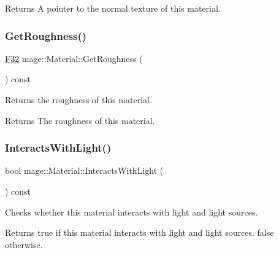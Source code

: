 \begin{DoxyReturn}{Returns}
A pointer to the normal texture of this material. 
\end{DoxyReturn}
\hypertarget{structmage_1_1_material_a5b1a4e965f812e18594cf7455d49139c}{}\label{structmage_1_1_material_a5b1a4e965f812e18594cf7455d49139c} 
\subsubsection{\texorpdfstring{Get\+Roughness()}{GetRoughness()}}
{\footnotesize\ttfamily \hyperlink{namespacemage_aa97e833b45f06d60a0a9c4fc22ae02c0}{F32} mage\+::\+Material\+::\+Get\+Roughness (\begin{DoxyParamCaption}{ }\end{DoxyParamCaption}) const\hspace{0.3cm}{\ttfamily [noexcept]}}

Returns the roughness of this material.

\begin{DoxyReturn}{Returns}
The roughness of this material. 
\end{DoxyReturn}
\hypertarget{structmage_1_1_material_a9bb48fe0f9f8d2c21073bdf650957bd6}{}\label{structmage_1_1_material_a9bb48fe0f9f8d2c21073bdf650957bd6} 
\subsubsection{\texorpdfstring{Interacts\+With\+Light()}{InteractsWithLight()}}
{\footnotesize\ttfamily bool mage\+::\+Material\+::\+Interacts\+With\+Light (\begin{DoxyParamCaption}{ }\end{DoxyParamCaption}) const\hspace{0.3cm}{\ttfamily [noexcept]}}

Checks whether this material interacts with light and light sources.

\begin{DoxyReturn}{Returns}
{\ttfamily true} if this material interacts with light and light sources. {\ttfamily false} otherwise. 
\end{DoxyReturn}
\hypertarget{structmage_1_1_material_a0df1804c29bfd9d2bbc606d6285dccec}{}\label{structmage_1_1_material_a0df1804c29bfd9d2bbc606d6285dccec} 
